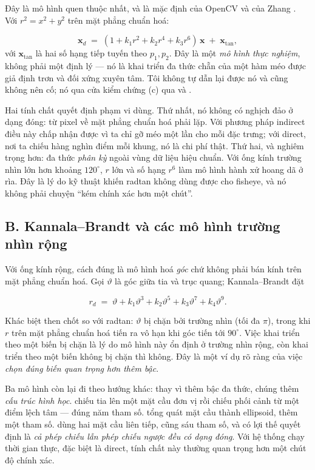 \documentclass[../../vslam.tex]{subfiles}
\begin{document}
Đây là mô hình quen thuộc nhất, và là mặc định của OpenCV và của Zhang \cite{zhang2000camera}. Với \(r^2 = x^2 + y^2\) trên mặt phẳng chuẩn hoá:

\[
\mathbf{x}_d \;=\; (1 + k_1 r^2 + k_2 r^4 + k_3 r^6)\,\mathbf{x} \;+\; \mathbf{x}_{\text{tan}},
\]
với \(\mathbf{x}_{\text{tan}}\) là hai số hạng tiếp tuyến theo \(p_1, p_2\). Đây là một \emph{mô hình thực nghiệm}, không phải một định lý --- nó là khai triển đa thức chẵn của một hàm méo được giả định trơn và đối xứng xuyên tâm. Tôi không tự dẫn lại được nó và cũng không nên cố; nó qua cửa kiểm chứng (c) qua \cite{zhang2000camera} và \cite{hartley2004}.

Hai tính chất quyết định phạm vi dùng. Thứ nhất, nó không có nghịch đảo ở dạng đóng: từ pixel về mặt phẳng chuẩn hoá phải lặp. Với phương pháp indirect điều này chấp nhận được vì ta chỉ gỡ méo một lần cho mỗi đặc trưng; với direct, nơi ta chiếu hàng nghìn điểm mỗi khung, nó là chi phí thật. Thứ hai, và nghiêm trọng hơn: đa thức \emph{phân kỳ} ngoài vùng dữ liệu hiệu chuẩn. Với ống kính trường nhìn lớn hơn khoảng \(120^\circ\), \(r\) lớn và số hạng \(r^6\) làm mô hình hành xử hoang dã ở rìa. Đây là lý do kỹ thuật khiến radtan không dùng được cho fisheye, và nó không phải chuyện ``kém chính xác hơn một chút''.

\subsection{B. Kannala--Brandt và các mô hình trường nhìn rộng}

Với ống kính rộng, cách đúng là mô hình hoá \emph{góc} chứ không phải bán kính trên mặt phẳng chuẩn hoá. Gọi \(\vartheta\) là góc giữa tia và trục quang; Kannala--Brandt \cite{kannala2006generic} đặt

\[
r_d \;=\; \vartheta + k_1\vartheta^3 + k_2\vartheta^5 + k_3\vartheta^7 + k_4\vartheta^9 .
\]

Khác biệt then chốt so với radtan: \(\vartheta\) bị chặn bởi trường nhìn (tối đa \(\pi\)), trong khi \(r\) trên mặt phẳng chuẩn hoá tiến ra vô hạn khi góc tiến tới \(90^\circ\). Việc khai triển theo một biến bị chặn là lý do mô hình này ổn định ở trường nhìn rộng, còn khai triển theo một biến không bị chặn thì không. Đây là một ví dụ rõ ràng của việc \emph{chọn đúng biến quan trọng hơn thêm bậc}.

Ba mô hình còn lại đi theo hướng khác: thay vì thêm bậc đa thức, chúng thêm \emph{cấu trúc hình học}.  \cite{mei2007ucm} chiếu tia lên một mặt cầu đơn vị rồi chiếu phối cảnh từ một điểm lệch tâm --- đúng năm tham số.  tổng quát mặt cầu thành ellipsoid, thêm một tham số.  \cite{usenko2018doublesphere} dùng hai mặt cầu liên tiếp, cũng sáu tham số, và có lợi thế quyết định là \emph{cả phép chiếu lẫn phép chiếu ngược đều có dạng đóng}. Với hệ thống chạy thời gian thực, đặc biệt là direct, tính chất này thường quan trọng hơn một chút độ chính xác.
\end{document}
